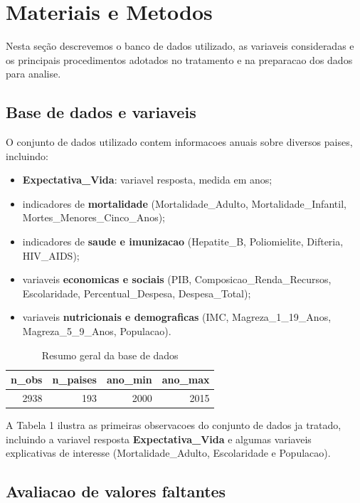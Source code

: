 \documentclass[
  12pt,
]{article}
\providecommand{\tightlist}{%
  \setlength{\itemsep}{0pt}\setlength{\parskip}{0pt}}
\begin{document}
\section{Materiais e Metodos}\label{materiais-e-metodos}

Nesta seção descrevemos o banco de dados utilizado, as variaveis
consideradas e os principais procedimentos adotados no tratamento e na
preparacao dos dados para analise.

\subsection{Base de dados e variaveis}\label{base-de-dados-e-variaveis}

O conjunto de dados utilizado contem informacoes anuais sobre diversos
paises, incluindo:

\begin{itemize}
\tightlist
\item
  \textbf{Expectativa\_Vida}: variavel resposta, medida em anos;
\item
  indicadores de \textbf{mortalidade} (Mortalidade\_Adulto,
  Mortalidade\_Infantil, Mortes\_Menores\_Cinco\_Anos);
\item
  indicadores de \textbf{saude e imunizacao} (Hepatite\_B, Poliomielite,
  Difteria, HIV\_AIDS);
\item
  variaveis \textbf{economicas e sociais} (PIB,
  Composicao\_Renda\_Recursos, Escolaridade, Percentual\_Despesa,
  Despesa\_Total);
\item
  variaveis \textbf{nutricionais e demograficas} (IMC,
  Magreza\_1\_19\_Anos, Magreza\_5\_9\_Anos, Populacao).
\end{itemize}

\begin{longtable}[t]{rrrr}
\caption{\label{tab:unnamed-chunk-3}Resumo geral da base de dados}\\
\toprule
n\_obs & n\_paises & ano\_min & ano\_max\\
\midrule
2938 & 193 & 2000 & 2015\\
\bottomrule
\end{longtable}

A Tabela 1 ilustra as primeiras observacoes do conjunto de dados ja
tratado, incluindo a variavel resposta \textbf{Expectativa\_Vida} e
algumas variaveis explicativas de interesse (Mortalidade\_Adulto,
Escolaridade e Populacao).

\subsection{Avaliacao de valores
faltantes}\label{avaliacao-de-valores-faltantes}
\end{document}
